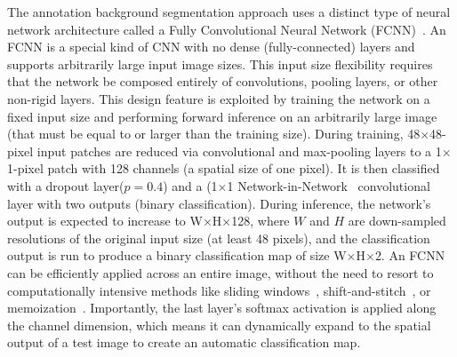 The annotation background segmentation approach uses a distinct type of neural network architecture called a Fully Convolutional Neural Network (FCNN)~\cite{long_fully_2015}.  An FCNN is a special kind of CNN with no dense (fully-connected) layers and supports arbitrarily large input image sizes.  This input size flexibility requires that the network be composed entirely of convolutions, pooling layers, or other non-rigid layers.  This design feature is exploited by training the network on a fixed input size and performing forward inference on an arbitrarily large image (that must be equal to or larger than the training size).  During training, 48$\times$48-pixel input patches are reduced via convolutional and max-pooling layers to a 1$\times$1-pixel patch with 128 channels (a spatial size of one pixel).  It is then classified with a dropout layer($p=0.4$) and a (1$\times$1 Network-in-Network~\cite{lin_network_2013} convolutional layer with two outputs (binary classification).  During inference, the network's output is expected to increase to W$\times$H$\times$128, where $W$ and $H$ are down-sampled resolutions of the original input size (at least 48 pixels), and the classification output is run to produce a binary classification map of size W$\times$H$\times$2.  An FCNN can be efficiently applied across an entire image, without the need to resort to computationally intensive methods like sliding windows~\cite{krizhevsky_imagenet_2012}, shift-and-stitch~\cite{sermanet_overfeat:_2013}, or memoization~\cite{esmaeilzadeh_neural_2012,graham_spatially-sparse_2014,zlateski_znnfast_2016}.  Importantly, the last layer's softmax activation is applied along the channel dimension, which means it can dynamically expand to the spatial output of a test image to create an automatic classification map.

